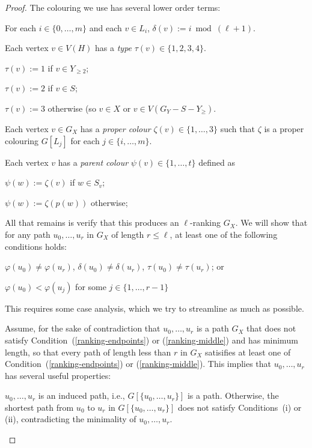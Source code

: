 \documentclass[kpfonts]{patmorin}
\theoremstyle{named}
\begin{document}
\begin{proof}
    The colouring we use has several lower order terms:
    \begin{compactenum}
        \item For each $i\in\{0,\ldots,m\}$ and each $v\in L_i$, $\delta(v):= i\bmod (\ell+1)$.
        \item Each vertex $v\in V(H)$ has a \emph{type} $\tau(v)\in\{1,2,3,4\}$.
        \begin{compactenum}
            \item $\tau(v):=1$ if $v\in Y_{\ge 2}$;
            \item $\tau(v):=2$ if $v\in S$;
            \item $\tau(v):=3$ otherwise (so $v\in X$ or $v\in V(G_Y-S-Y_{\ge})$.
        \end{compactenum}
        \item Each vertex $v\in G_X$ has a \emph{proper colour} $\zeta(v)\in\{1,\ldots,3\}$ such that $\zeta$ is a proper colouring $G[L_j]$ for each $j\in\{i,\ldots,m\}$.
        \item Each vertex $v$ has a \emph{parent colour} $\psi(v)\in\{1,\ldots,t\}$ defined as
        \begin{compactenum}
            \item $\psi(w):=\zeta(v)$ if $w\in S_v$;
            \item $\psi(w):=\zeta(p(w))$ otherwise;
        \end{compactenum}
    \end{compactenum}

    All that remains is verify that this produces an $\ell$-ranking $G_X$.  We will show that for any path $u_0,\ldots,u_r$ in $G_X$ of length $r\le\ell$, at least one of the following conditions holds:
    \begin{compactenum}[(i)]
        \item $\varphi(u_0)\neq\varphi(u_r)$, $\delta(u_0)\neq\delta(u_r)$, $\tau(u_0)\neq\tau(u_r)$; or \label{ranking-endpoints}
        \item $\varphi(u_0) < \varphi(u_j)$ for some $j\in\{1,\ldots,r-1\}$ \label{ranking-middle}
    \end{compactenum}
    This requires some case analysis, which we try to streamline as much as possible.

    Assume, for the sake of contradiction that $u_0,\ldots,u_r$ is a path $G_X$ that does not satisfy Condition~(\ref{ranking-endpoints}) or (\ref{ranking-middle}) and has minimum length, so that every path of length less than $r$ in $G_X$ satisifies at least one of Condition~(\ref{ranking-endpoints}) or (\ref{ranking-middle}).
    This implies that $u_0,\ldots,u_r$ has several useful properties:
    \begin{compactenum}[(P1)]
        \item $u_0,\ldots,u_r$ is an induced path, i.e., $G[\{u_0,\ldots,u_r\}]$ is a path.  Otherwise, the shortest path from $u_0$ to $u_r$ in $G[\{u_0,\ldots,u_r\}]$ does not satisfy Conditions~(i) or (ii), contradicting the minimality of $u_0,\ldots,u_r$.\label{p-induced}


\end{compactenum}
\end{proof}
\end{document}
